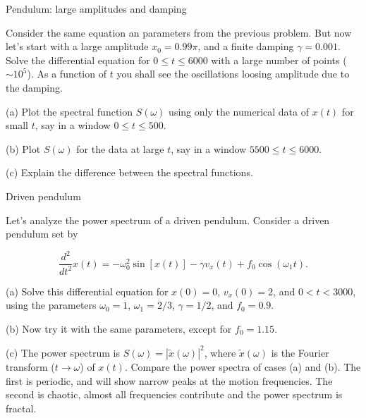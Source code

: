 \begin{problem}{Pendulum: large amplitudes and damping}
 \label{prob:FFTpendulum2}
 
 Consider the same equation an parameters from the previous problem. But now let's start with a large amplitude $x_0 = 0.99\pi$, and a finite damping $\gamma = 0.001$. Solve the differential equation for $0 \leq t \leq 6000$ with a large number of points ($\sim 10^5$). As a function of $t$ you shall see the oscillations loosing amplitude due to the damping.
 
 (a) Plot the spectral function $S(\omega)$ using only the numerical data of $x(t)$ for small $t$, say in a window $0 \leq t \leq 500$.
 
 (b) Plot $S(\omega)$ for the data at large $t$, say in a window $5500 \leq t \leq 6000$.
 
 (c) Explain the difference between the spectral functions.
 
\end{problem}


\begin{problem}{Driven pendulum}
  \label{prob:drivenpendulum}

  Let's analyze the power spectrum of a driven pendulum\cite{pang2006introduction}. Consider a driven pendulum set by 
  
  \begin{equation}
   \dfrac{d^2}{dt^2} x(t) = -\omega_0^2 \sin[x(t)] -\gamma v_x(t) + f_0\cos(\omega_1 t).
  \end{equation}

  (a) Solve this differential equation for $x(0) = 0$, $v_x(0) = 2$, and $0 < t < 3000$, using the parameters $\omega_0 = 1$, $\omega_1 = 2/3$, $\gamma = 1/2$, and $f_0 = 0.9$.
  
  (b) Now try it with the same parameters, except for $f_0 = 1.15$.
  
  (c) The power spectrum is $S(\omega) = |\tilde{x}(\omega)|^2$, where $\tilde{x}(\omega)$ is the Fourier transform ($t \rightarrow \omega$) of $x(t)$. Compare the power spectra of cases (a) and (b). The first is periodic, and will show narrow peaks at the motion frequencies. The second is chaotic, almost all frequencies contribute and the power spectrum is fractal.
  
\end{problem}



